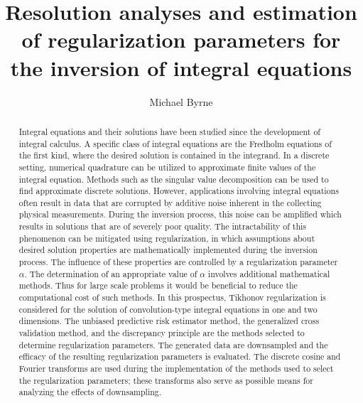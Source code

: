 \documentclass[12pt,letterpaper]{report}
\newcommand{\regparam}{\alpha}
\begin{document}
\title{Resolution analyses and estimation of regularization parameters for the inversion of integral equations}
\author{Michael Byrne}

\maketitle
\doublespace

\begin{abstract}
Integral equations and their solutions have been studied since the development of integral calculus. A specific class of integral equations are the Fredholm equations of the first kind, where the desired solution is contained in the integrand. In a discrete setting, numerical quadrature can be utilized to approximate finite values of the integral equation. Methods such as the singular value decomposition can be used to find approximate discrete solutions. However, applications involving integral equations often result in data that are corrupted by additive noise inherent in the collecting physical measurements. During the inversion process, this noise can be amplified which results in solutions that are of severely poor quality. The intractability of this phenomenon can be mitigated using regularization, in which assumptions about desired solution properties are mathematically implemented during the inversion process. The influence of these properties are controlled by a regularization parameter $\regparam$. The determination of an appropriate value of $\regparam$ involves additional mathematical methods. Thus for large scale problems it would be beneficial to reduce the computational cost of such methods. In this prospectus, Tikhonov regularization is considered for the solution of convolution-type integral equations in one and two dimensions. The unbiased predictive risk estimator method, the generalized cross validation method, and the discrepancy principle are the methods selected to determine regularization parameters. The generated data are downsampled and the efficacy of the resulting regularization parameters is evaluated. The discrete cosine and Fourier transforms are used during the implementation of the methods used to select the regularization parameters; these transforms also serve as possible means for analyzing the effects of downsampling.
\end{abstract}
\end{document}
